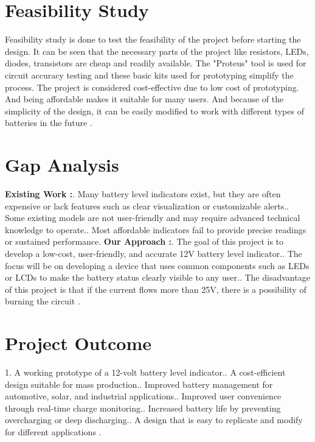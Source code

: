 \section{Feasibility Study}
Feasibility study is done to test the feasibility of the project before starting the design. It can be seen that the necessary parts of the project like resistors, LEDs, diodes, transistors are cheap and readily available. The "Proteus" tool is used for circuit accuracy testing and these basic kits used for prototyping simplify the process. The project is considered cost-effective due to low cost of prototyping. And being affordable makes it suitable for many users. And because of the simplicity of the design, it can be easily modified to work with different types of batteries in the future \cite{b7}.

\section{Gap Analysis}
\textbf{Existing Work :}. Many battery level indicators exist, but they are often expensive or lack features such as clear visualization or customizable alerts.. Some existing models are not user-friendly and may require advanced technical knowledge to operate.. Most affordable indicators fail to provide precise readings or sustained performance.\newline
\textbf{Our Approach :}. The goal of this project is to develop a low-cost, user-friendly, and accurate 12V battery level indicator.. The focus will be on developing a device that uses common components such as LEDs or LCDs to make the battery status clearly visible to any user.. The disadvantage of this project is that if the current flows more than 25V, there is a possibility of burning the circuit \cite{b8}.
\section{Project Outcome}
1. A working prototype of a 12-volt battery level indicator.. A cost-efficient design suitable for mass production.. Improved battery management for automotive, solar, and industrial applications.. Improved user convenience through real-time charge monitoring.. Increased battery life by preventing overcharging or deep discharging.. A design that is easy to replicate and modify for different applications \cite{b9}.
